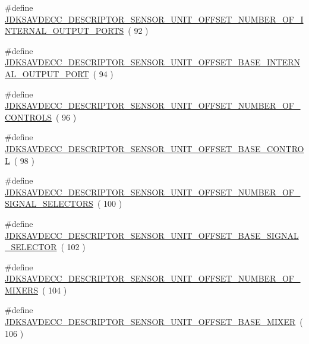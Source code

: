 \begin{DoxyCompactItemize}
\item 
\#define \hyperlink{group__descriptor__sensor_ga220512d3144da1d8d1a57a26e62df03b}{J\+D\+K\+S\+A\+V\+D\+E\+C\+C\+\_\+\+D\+E\+S\+C\+R\+I\+P\+T\+O\+R\+\_\+\+S\+E\+N\+S\+O\+R\+\_\+\+U\+N\+I\+T\+\_\+\+O\+F\+F\+S\+E\+T\+\_\+\+N\+U\+M\+B\+E\+R\+\_\+\+O\+F\+\_\+\+I\+N\+T\+E\+R\+N\+A\+L\+\_\+\+O\+U\+T\+P\+U\+T\+\_\+\+P\+O\+R\+TS}~( 92 )
\item 
\#define \hyperlink{group__descriptor__sensor_gafad86815b51ee68f38844f48f92eacbb}{J\+D\+K\+S\+A\+V\+D\+E\+C\+C\+\_\+\+D\+E\+S\+C\+R\+I\+P\+T\+O\+R\+\_\+\+S\+E\+N\+S\+O\+R\+\_\+\+U\+N\+I\+T\+\_\+\+O\+F\+F\+S\+E\+T\+\_\+\+B\+A\+S\+E\+\_\+\+I\+N\+T\+E\+R\+N\+A\+L\+\_\+\+O\+U\+T\+P\+U\+T\+\_\+\+P\+O\+RT}~( 94 )
\item 
\#define \hyperlink{group__descriptor__sensor_ga9d49cc61bf836971e52483da7d1511dd}{J\+D\+K\+S\+A\+V\+D\+E\+C\+C\+\_\+\+D\+E\+S\+C\+R\+I\+P\+T\+O\+R\+\_\+\+S\+E\+N\+S\+O\+R\+\_\+\+U\+N\+I\+T\+\_\+\+O\+F\+F\+S\+E\+T\+\_\+\+N\+U\+M\+B\+E\+R\+\_\+\+O\+F\+\_\+\+C\+O\+N\+T\+R\+O\+LS}~( 96 )
\item 
\#define \hyperlink{group__descriptor__sensor_ga6574c57e6e180ece083f8d3cc50def99}{J\+D\+K\+S\+A\+V\+D\+E\+C\+C\+\_\+\+D\+E\+S\+C\+R\+I\+P\+T\+O\+R\+\_\+\+S\+E\+N\+S\+O\+R\+\_\+\+U\+N\+I\+T\+\_\+\+O\+F\+F\+S\+E\+T\+\_\+\+B\+A\+S\+E\+\_\+\+C\+O\+N\+T\+R\+OL}~( 98 )
\item 
\#define \hyperlink{group__descriptor__sensor_gaaaf2be1e7737cd21904cb282136bbff6}{J\+D\+K\+S\+A\+V\+D\+E\+C\+C\+\_\+\+D\+E\+S\+C\+R\+I\+P\+T\+O\+R\+\_\+\+S\+E\+N\+S\+O\+R\+\_\+\+U\+N\+I\+T\+\_\+\+O\+F\+F\+S\+E\+T\+\_\+\+N\+U\+M\+B\+E\+R\+\_\+\+O\+F\+\_\+\+S\+I\+G\+N\+A\+L\+\_\+\+S\+E\+L\+E\+C\+T\+O\+RS}~( 100 )
\item 
\#define \hyperlink{group__descriptor__sensor_ga8050e1528bdea79b2151a88e223e80dd}{J\+D\+K\+S\+A\+V\+D\+E\+C\+C\+\_\+\+D\+E\+S\+C\+R\+I\+P\+T\+O\+R\+\_\+\+S\+E\+N\+S\+O\+R\+\_\+\+U\+N\+I\+T\+\_\+\+O\+F\+F\+S\+E\+T\+\_\+\+B\+A\+S\+E\+\_\+\+S\+I\+G\+N\+A\+L\+\_\+\+S\+E\+L\+E\+C\+T\+OR}~( 102 )
\item 
\#define \hyperlink{group__descriptor__sensor_ga88bc16e5e2eeee704c2730aa2312360c}{J\+D\+K\+S\+A\+V\+D\+E\+C\+C\+\_\+\+D\+E\+S\+C\+R\+I\+P\+T\+O\+R\+\_\+\+S\+E\+N\+S\+O\+R\+\_\+\+U\+N\+I\+T\+\_\+\+O\+F\+F\+S\+E\+T\+\_\+\+N\+U\+M\+B\+E\+R\+\_\+\+O\+F\+\_\+\+M\+I\+X\+E\+RS}~( 104 )
\item 
\#define \hyperlink{group__descriptor__sensor_ga8aa047dd3c7efacdf0b71b41dc7ea7fa}{J\+D\+K\+S\+A\+V\+D\+E\+C\+C\+\_\+\+D\+E\+S\+C\+R\+I\+P\+T\+O\+R\+\_\+\+S\+E\+N\+S\+O\+R\+\_\+\+U\+N\+I\+T\+\_\+\+O\+F\+F\+S\+E\+T\+\_\+\+B\+A\+S\+E\+\_\+\+M\+I\+X\+ER}~( 106 )

\end{DoxyCompactItemize}
